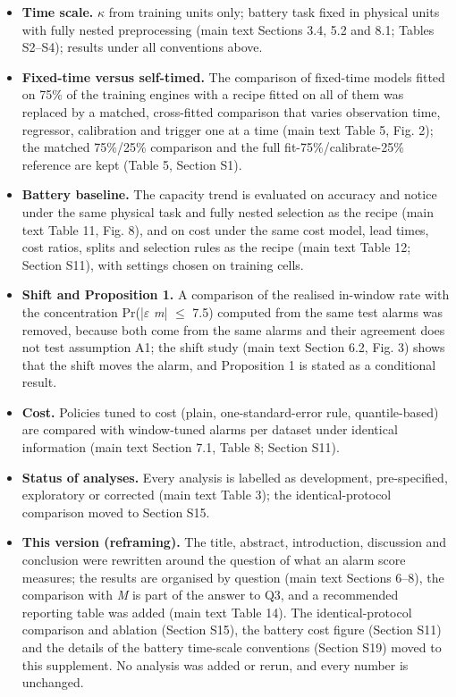\documentclass[11pt,a4paper]{article}
\begin{document}
\begin{itemize}[leftmargin=1.2em,itemsep=2pt]
\item \textbf{Time scale.} $\kappa$ from training units only; battery task fixed in physical units with fully nested preprocessing (main text Sections 3.4, 5.2 and 8.1; Tables S2--S4); results under all conventions above.
\item \textbf{Fixed-time versus self-timed.} The comparison of fixed-time models fitted on 75\% of the training engines with a recipe fitted on all of them was replaced by a matched, cross-fitted comparison that varies observation time, regressor, calibration and trigger one at a time (main text Table 5, Fig. 2); the matched 75\%/25\% comparison and the full fit-75\%/calibrate-25\% reference are kept (Table 5, Section S1).
\item \textbf{Battery baseline.} The capacity trend is evaluated on accuracy and notice under the same physical task and fully nested selection as the recipe (main text Table 11, Fig. 8), and on cost under the same cost model, lead times, cost ratios, splits and selection rules as the recipe (main text Table 12; Section S11), with settings chosen on training cells.
\item \textbf{Shift and Proposition 1.} A comparison of the realised in-window rate with the concentration Pr(|$\varepsilon$ \textminus{} \textit{m}| $\le$ 7.5) computed from the same test alarms was removed, because both come from the same alarms and their agreement does not test assumption A1; the shift study (main text Section 6.2, Fig. 3) shows that the shift moves the alarm, and Proposition 1 is stated as a conditional result.
\item \textbf{Cost.} Policies tuned to cost (plain, one-standard-error rule, quantile-based) are compared with window-tuned alarms per dataset under identical information (main text Section 7.1, Table 8; Section S11).
\item \textbf{Status of analyses.} Every analysis is labelled as development, pre-specified, exploratory or corrected (main text Table 3); the identical-protocol comparison moved to Section S15.
\item \textbf{This version (reframing).} The title, abstract, introduction, discussion and conclusion were rewritten around the question of what an alarm score measures; the results are organised by question (main text Sections 6--8), the comparison with \textit{M} is part of the answer to Q3, and a recommended reporting table was added (main text Table 14). The identical-protocol comparison and ablation (Section S15), the battery cost figure (Section S11) and the details of the battery time-scale conventions (Section S19) moved to this supplement. No analysis was added or rerun, and every number is unchanged.

\end{itemize}
\end{document}
